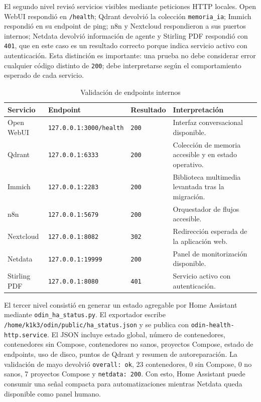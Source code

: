 El segundo nivel revisó servicios visibles mediante peticiones HTTP locales. Open WebUI respondió en \texttt{/health}; Qdrant devolvió la colección \texttt{memoria\_ia}; Immich respondió en su endpoint de ping; n8n y Nextcloud respondieron a sus puertos internos; Netdata devolvió información de agente y Stirling PDF respondió con \texttt{401}, que en este caso es un resultado correcto porque indica servicio activo con autenticación. Esta distinción es importante: una prueba no debe considerar error cualquier código distinto de \texttt{200}; debe interpretarse según el comportamiento esperado de cada servicio.

\begin{table}[H]
  \centering
  \caption{Validación de endpoints internos}
  \label{tab:validacion-endpoints}
  \begin{tabularx}{\textwidth}{l l l X}
    \toprule
    Servicio & Endpoint & Resultado & Interpretación \\
    \midrule
    Open WebUI & \texttt{127.0.0.1:3000/health} & \texttt{200} & Interfaz conversacional disponible. \\
    Qdrant & \texttt{127.0.0.1:6333} & \texttt{200} & Colección de memoria accesible y en estado operativo. \\
    Immich & \texttt{127.0.0.1:2283} & \texttt{200} & Biblioteca multimedia levantada tras la migración. \\
    n8n & \texttt{127.0.0.1:5679} & \texttt{200} & Orquestador de flujos accesible. \\
    Nextcloud & \texttt{127.0.0.1:8082} & \texttt{302} & Redirección esperada de la aplicación web. \\
    Netdata & \texttt{127.0.0.1:19999} & \texttt{200} & Panel de monitorización disponible. \\
    Stirling PDF & \texttt{127.0.0.1:8080} & \texttt{401} & Servicio activo con autenticación. \\
    \bottomrule
  \end{tabularx}
\end{table}

El tercer nivel consistió en generar un estado agregable por Home Assistant mediante \texttt{odin\_ha\_status.py}. El exportador escribe \nolinkurl{/home/k1k3/odin/public/ha_status.json} y se publica con \texttt{odin-health-http.service}. El JSON incluye estado global, número de contenedores, contenedores sin Compose, contenedores no sanos, proyectos Compose, estado de endpoints, uso de disco, puntos de Qdrant y resumen de autoreparación. La validación de mayo devolvió \texttt{overall: ok}, 23 contenedores, 0 sin Compose, 0 no sanos, 7 proyectos Compose y \texttt{netdata: 200}. Con esto, Home Assistant puede consumir una señal compacta para automatizaciones mientras Netdata queda disponible como panel humano.

